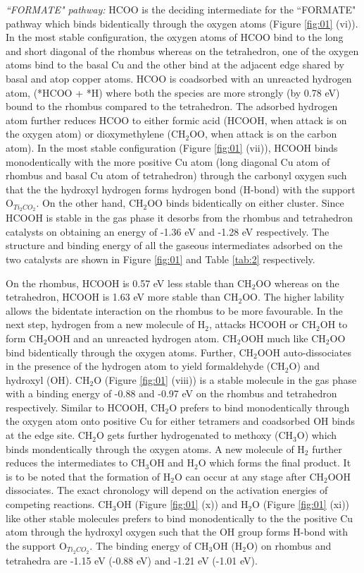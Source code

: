 \noindent \textit{``FORMATE" pathway:} HCOO is the deciding intermediate for the ``FORMATE" pathway which binds bidentically through the oxygen atoms (Figure \ref{fig:01} (vi)). In the most stable configuration, the oxygen atoms of HCOO bind to the long and short diagonal of the rhombus whereas on the tetrahedron, one of the oxygen atoms bind to the basal Cu and the other bind at the adjacent edge shared by basal and atop copper atoms. HCOO is coadsorbed with an unreacted hydrogen atom, (*HCOO + *H) where both the species are more strongly (by 0.78 eV) bound to the rhombus compared to the tetrahedron. The adsorbed hydrogen atom further reduces HCOO to either formic acid (HCOOH, when attack is on the oxygen atom) or dioxymethylene (CH$_2$OO, when attack is on the carbon atom). In the most stable configuration (Figure \ref{fig:01} (vii)), HCOOH binds monodentically with the more positive Cu atom (long diagonal Cu atom of rhombus and basal Cu atom of tetrahedron) through the carbonyl oxygen such that the the hydroxyl hydrogen forms hydrogen bond (H-bond) with the support O$_{Ti_{2}CO_{2}}$. On the other hand, CH$_2$OO binds bidentically on either cluster. Since HCOOH is stable in the gas phase it desorbs from the rhombus and tetrahedron catalysts on obtaining an energy of -1.36 eV and -1.28 eV respectively. The structure and binding energy of all the gaseous intermediates adsorbed on the two catalysts are shown in Figure \ref{fig:01} and Table \ref{tab:2} respectively. 

On the rhombus, HCOOH is 0.57 eV less stable than CH$_2$OO whereas on the tetrahedron, HCOOH is 1.63 eV more stable than CH$_2$OO. The higher lability allows the bidentate interaction on the rhombus to be more favourable. In the next step, hydrogen from a new molecule of H$_2$, attacks HCOOH or CH$_2$OH to form CH$_2$OOH and an unreacted hydrogen atom. CH$_2$OOH much like CH$_2$OO bind bidentically through the oxygen atoms. Further, CH$_2$OOH auto-dissociates in the presence of the hydrogen atom to yield formaldehyde (CH$_2$O) and hydroxyl (OH). CH$_2$O (Figure \ref{fig:01} (viii)) is a stable molecule in the gas phase with a binding energy of -0.88 and -0.97 eV on the rhombus and tetrahedron respectively. Similar to HCOOH, CH$_2$O prefers to bind monodentically through the oxygen atom onto positive Cu for either tetramers and coadsorbed OH binds at the edge site. CH$_2$O gets further hydrogenated to methoxy (CH$_3$O) which binds mondentically through the oxygen atoms. A new molecule of H$_2$ further reduces the intermediates to CH$_3$OH and H$_2$O which forms the final product. It is to be noted that the formation of H$_2$O can occur at any stage after CH$_2$OOH dissociates. The exact chronology will depend on the activation energies of competing reactions. CH$_3$OH (Figure \ref{fig:01} (x)) and H$_2$O (Figure \ref{fig:01} (xi)) like other stable molecules prefers to bind monodentically to the the positive Cu atom through the hydroxyl oxygen such that the OH group forms H-bond with the support O$_{Ti_{2}CO_{2}}$. The binding energy of CH$_3$OH (H$_2$O) on rhombus and tetrahedra are -1.15 eV (-0.88 eV) and -1.21 eV (-1.01 eV). 

